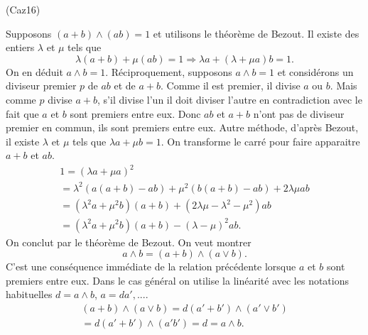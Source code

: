 \begin{tiny}(Caz16)\end{tiny} Supposons $(a+b)\wedge(ab) = 1$ et utilisons le théorème de Bezout. Il existe des entiers $\lambda$ et $\mu$ tels que
\[
 \lambda(a+b) + \mu(ab)= 1 
 \Rightarrow
 \lambda a + (\lambda + \mu a) b = 1.
\]
On en déduit $a\wedge b =1$.\newline
Réciproquement, supposons $a\wedge b = 1$ et considérons un diviseur premier $p$ de $ab$ et de $a+b$. Comme il est premier, il divise $a$ ou $b$. Mais comme $p$ divise $a+b$, s'il divise l'un il doit diviser l'autre en contradiction avec le fait que $a$ et $b$ sont premiers entre eux. Donc $ab$ et $a+b$ n'ont pas de diviseur premier en commun, ils sont premiers entre eux.\newline
Autre méthode, d'après Bezout, il existe $\lambda$ et $\mu$ tels que $\lambda a + \mu b = 1$. On transforme le carré pour faire apparaitre $a+b$ et $ab$.
\begin{multline*}
 1 = (\lambda a + \mu a)^2 \\
 = \lambda^2 \left( a(a+b) -ab\right) + \mu^2\left( b(a+b) - ab\right) + 2\lambda \mu ab\\
 = \left( \lambda^2 a + \mu^2 b\right) (a+b) + \left(2\lambda \mu -\lambda^2 - \mu^2 \right) ab \\
 = \left( \lambda^2 a + \mu^2 b\right) (a+b) - (\lambda - \mu)^2 ab .
\end{multline*}
On conclut par le théorème de Bezout.
On veut montrer
\[
a\wedge b=(a+b)\wedge (a\vee b).
\]
C'est une conséquence immédiate de la relation précédente lorsque $a$ et $b$ sont premiers entre eux. Dans le cas général on utilise la linéarité avec les notations habituelles $d =a \wedge b$, $a = da', ...$.
\begin{multline*}
 (a+b)\wedge(a\vee b) = d (a'+b')\wedge (a'\vee b') \\
 = d (a'+b')\wedge (a'b') = d = a\wedge b.
\end{multline*}
